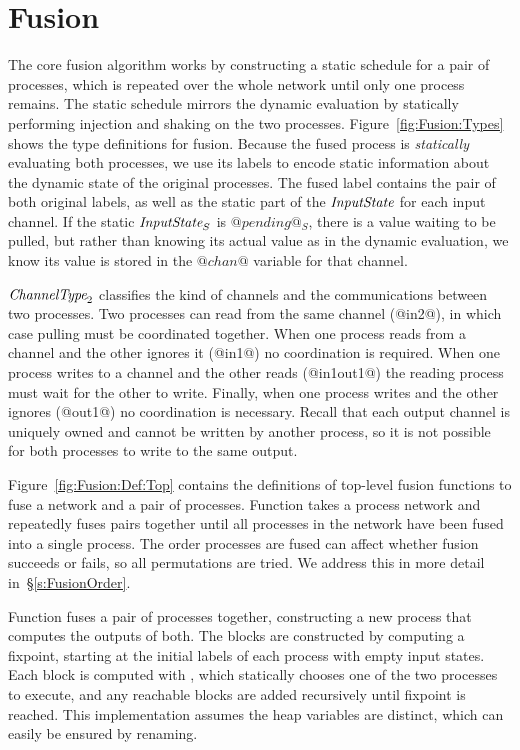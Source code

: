 \section{Fusion}
\label{s:Fusion}




The core fusion algorithm works by constructing a static schedule for a pair of processes, which is repeated over the whole network until only one process remains.
The static schedule mirrors the dynamic evaluation by statically performing injection and shaking on the two processes.
Figure~\ref{fig:Fusion:Types} shows the type definitions for fusion.
Because the fused process is \emph{statically} evaluating both processes, we use its labels to encode static information about the dynamic state of the original processes.
The fused label contains the pair of both original labels, as well as the static part of the $\textit{InputState}$ for each input channel.
If the static $\textit{InputState}_S$ is $@pending@_S$, there is a value waiting to be pulled, but rather than knowing its actual value as in the dynamic evaluation, we know its value is stored in the $@chan@$ variable for that channel.

$\textit{ChannelType}_2$ classifies the kind of channels and the communications between two processes.
Two processes can read from the same channel (@in2@), in which case pulling must be coordinated together.
When one process reads from a channel and the other ignores it (@in1@) no coordination is required.
When one process writes to a channel and the other reads (@in1out1@) the reading process must wait for the other to write.
Finally, when one process writes and the other ignores (@out1@) no coordination is necessary.
Recall that each output channel is uniquely owned and cannot be written by another process, so it is not possible for both processes to write to the same output.



Figure~\ref{fig:Fusion:Def:Top} contains the definitions of top-level fusion functions to fuse a network and a pair of processes.
Function  takes a process network and repeatedly fuses pairs together until all processes in the network have been fused into a single process.
The order processes are fused can affect whether fusion succeeds or fails, so all permutations are tried.
We address this in more detail in~\S\ref{s:FusionOrder}.

Function  fuses a pair of processes together, constructing a new process that computes the outputs of both.
The blocks are constructed by computing a fixpoint, starting at the initial labels of each process with empty input states.
Each block is computed with , which statically chooses one of the two processes to execute, and any reachable blocks are added recursively until fixpoint is reached.
This implementation assumes the heap variables are distinct, which can easily be ensured by renaming.

